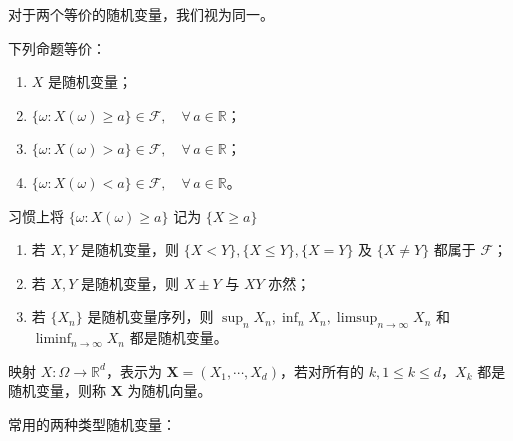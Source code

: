 \documentclass[lang=cn,10pt,thmcnt=section]{elegantbook}
\begin{document}
\begin{remark}

	对于两个等价的随机变量，我们视为同一。
	
\end{remark}
\begin{theorem}
	下列命题等价：
\begin{enumerate}
    \item $X$ 是随机变量；
    \item $\{\omega : X(\omega) \geq a\} \in \mathcal{F}, \quad \forall \, a \in \mathbb{R}$；
    \item $\{\omega : X(\omega) > a\} \in \mathcal{F}, \quad \forall \, a \in \mathbb{R}$；
    \item $\{\omega : X(\omega) < a\} \in \mathcal{F}, \quad \forall \, a \in \mathbb{R}$。
\end{enumerate}
\end{theorem}
\begin{remark}
	
	习惯上将 $\{\omega : X(\omega) \geq a\}$ 记为 $\{X \geq a\}$
\end{remark}



\begin{theorem}
	\begin{enumerate}
		\item 若 $X, Y$ 是随机变量，则 $\{X < Y\}, \{X \leq Y\}, \{X = Y\}$ 及 $\{X \neq Y\}$ 都属于 $\mathcal{F}$；
		\item 若 $X, Y$ 是随机变量，则 $X \pm Y$ 与 $XY$ 亦然；
		\item 若 $\{X_n\}$ 是随机变量序列，则 $\sup_n X_n, \inf_n X_n, \limsup_{n \to \infty} X_n$ 和 $\liminf_{n \to \infty} X_n$ 都是随机变量。
	\end{enumerate}
	
	映射 $X : \Omega \to \mathbb{R}^d$，表示为 $\mathbf{X} = (X_1, \cdots, X_d)$，若对所有的 $k, 1 \leq k \leq d$，$X_k$ 都是随机变量，则称 $\mathbf{X}$ 为随机向量。
	
\end{theorem}

常用的两种类型随机变量：
\end{document}
